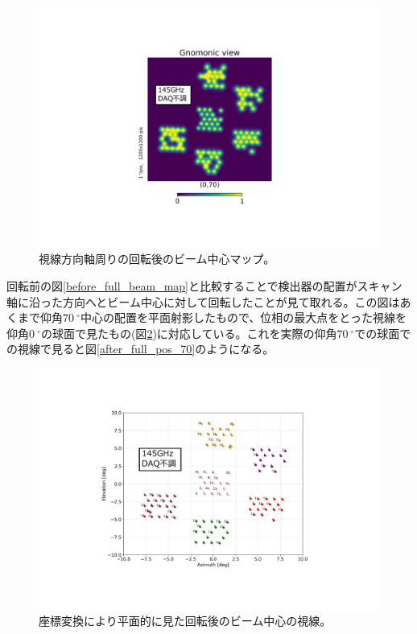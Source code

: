 \begin{figure}[htbp]
  \centering
  \includegraphics[width=0.8\columnwidth]{5_alignment/figs/after_full_gnomonic_70_mod.pdf}
  \caption{視線方向軸周りの回転後のビーム中心マップ。}
  \label{after_full_beam_map}
\end{figure}
回転前の図\ref{before_full_beam_map}と比較することで検出器の配置がスキャン軸に沿った方向へとビーム中心に対して回転したことが見て取れる。この図はあくまで仰角$\SI{70}{^{\circ}}$中心の配置を平面射影したもので、位相の最大点をとった視線を仰角$\SI{0}{^{\circ}}$の球面で見たもの(図\ref{after_full_pos_0})に対応している。これを実際の仰角$\SI{70}{^{\circ}}$での球面での視線で見ると図\ref{after_full_pos_70}のようになる。
\begin{figure}[htbp]
  \centering
  \includegraphics[width=1.0\columnwidth]{5_alignment/figs/after_full_pos_0_mod.pdf}
  \caption{座標変換により平面的に見た回転後のビーム中心の視線。}
  \label{after_full_pos_0}
\end{figure}

